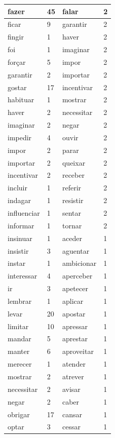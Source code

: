 \documentclass[output=paper,colorlinks,citecolor=brown]{langscibook}
\begin{document}
\begin{longtable}{ p{3cm} | p{1cm} | p{3cm} | p{1cm} }
			fazer & 45 & falar & 2\\\hline
			ficar & 9 & garantir & 2\\\hline
			fingir & 1 & haver & 2\\\hline
			foi & 1 & imaginar & 2\\\hline
			forçar & 5 & impor & 2\\\hline
			garantir & 2 & importar & 2\\\hline
			gostar & 17 & incentivar & 2\\\hline
			habituar & 1 & mostrar & 2\\\hline
			haver & 2 & necessitar & 2\\\hline
			imaginar & 2 & negar & 2\\\hline
			impedir & 4 & ouvir & 2\\\hline
			impor & 2 & parar & 2\\\hline
			importar & 2 & queixar & 2\\\hline
			incentivar & 2 & receber & 2\\\hline
			incluir & 1 & referir & 2\\\hline
			indagar & 1 & resistir & 2\\\hline
			influenciar & 1 & sentar & 2\\\hline
			informar & 1 & tornar & 2\\\hline
			insinuar & 1 & aceder & 1\\\hline
			insistir & 3 & aguentar & 1\\\hline
			instar & 1 & ambicionar & 1\\\hline
			interessar & 4 & aperceber & 1\\\hline
			ir & 3 & apetecer & 1\\\hline
			lembrar & 1 & aplicar & 1\\\hline
			levar & 20 & apostar & 1\\\hline
			limitar & 10 & apressar & 1\\\hline
			mandar & 5 & aprestar & 1\\\hline
			manter & 6 & aproveitar & 1\\\hline
			merecer & 1 & atender & 1\\\hline
			mostrar & 2 & atrever & 1\\\hline
			necessitar & 2 & avisar & 1\\\hline
			negar & 2 & caber & 1\\\hline
			obrigar & 17 & cansar & 1\\\hline
			optar & 3 & cessar & 1\\\hline

\end{longtable}
\end{document}
